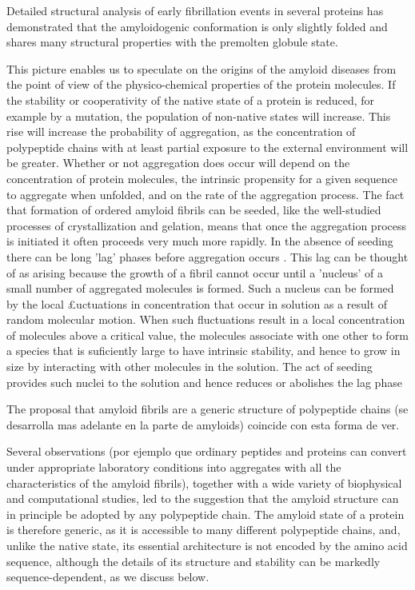 Detailed structural analysis of early fibrillation events in several proteins has demonstrated that the amyloidogenic conformation is only slightly folded and shares many structural properties with the premolten globule state.

This picture enables us to speculate on the origins of the amyloid diseases from the point of view of the physico-chemical properties of the protein molecules. If
the stability or cooperativity of the native state of a protein is reduced, for example by a mutation, the population of non-native states will increase.
This rise will increase the probability of aggregation, as the concentration of polypeptide chains with at least partial exposure to the external environment will be greater. Whether or not aggregation does occur will depend on
the concentration of protein molecules, the intrinsic propensity for a given sequence to aggregate when unfolded, and on the rate of the aggregation process. The
fact that formation of ordered amyloid fibrils can be seeded, like the well-studied processes of crystallization
and gelation, means that once the aggregation process is initiated it often proceeds very much more rapidly.
In the absence of seeding there can be long 'lag' phases before aggregation occurs . This lag can be thought of as arising because the growth of a fibril cannot occur until a 'nucleus' of a small number
of aggregated molecules is formed. Such a nucleus can be formed by the local £uctuations in concentration that occur in solution as a result of random molecular motion. When such fluctuations result in a local concentration of
molecules above a critical value, the molecules associate with one other to form a species that is suficiently large to have intrinsic stability, and hence to grow in size by interacting with other molecules in the solution. The act
of seeding provides such nuclei to the solution and hence reduces or abolishes the lag phase

The proposal that amyloid fibrils are a generic structure of polypeptide chains (se desarrolla mas adelante en la parte de amyloids) coincide con esta forma de ver.

Several observations (por ejemplo que ordinary peptides and proteins can convert under appropriate laboratory conditions into aggregates with all the characteristics of the amyloid fibrils),
together with a wide variety of biophysical and computational studies, led to the suggestion that the amyloid structure can in principle be adopted by any polypeptide chain.
The amyloid state of a protein is therefore generic, as it is accessible to many different polypeptide chains, and, unlike the native state, its essential architecture is not encoded by the amino acid sequence,
although the details of its structure and stability can be markedly sequence-dependent, as we discuss below. 

